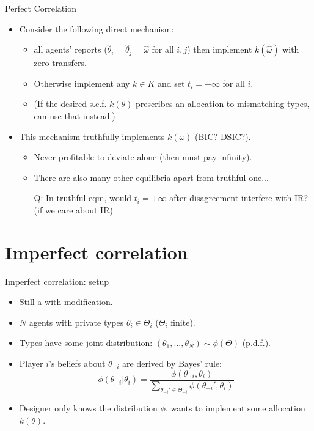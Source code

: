 \documentclass[english,10pt
,aspectratio=169
]{beamer}
\begin{document}
\begin{frame}{Perfect Correlation}
\begin{itemize}
	\item Consider the following direct mechanism:
	\begin{itemize}
		\item {} all agents' reports  ($\hat{\theta}_i=\hat{\theta}_j=\hat{\omega}$ for all $i,j$) then implement $k(\hat{\omega})$ with zero transfers.
		\item \alert{Otherwise} implement any $k \in K$ and set \alert{$t_i = +\infty$} for all $i$.
		\item (If the desired s.c.f. $k(\theta)$ prescribes an allocation to mismatching types, can use that instead.)
	\end{itemize}
	\item This mechanism truthfully implements $k(\omega)$ (BIC? DSIC?).
	\begin{itemize}
		\item Never profitable to deviate alone (then must pay infinity).
		\item There are also many other equilibria apart from truthful one...
		\item[Q:] In truthful eqm, would $t_i = +\infty$ after disagreement interfere with IR? (if we care about IR)
	\end{itemize}
\end{itemize}
\end{frame}


\section{Imperfect correlation}

\begin{frame}{Imperfect correlation: setup}
\begin{itemize}
	\item Still a  with modification.
	\item $N$ agents with private types $\theta_i \in \Theta_i$ ($\Theta_i$ finite).
	\item Types have some joint distribution: $(\theta_1,...,\theta_N) \sim \phi(\Theta)$ (p.d.f.).
	\item Player $i$'s beliefs about $\theta_{-i}$ are derived by Bayes' rule:
	$$\phi(\theta_{-i}|\theta_i) = \frac{\phi(\theta_{-i},\theta_i)}{\sum_{\theta_{-i}' \in \Theta_{-i}} \phi(\theta_{-i}',\theta_i)} $$
	\item Designer only knows the distribution $\phi$, wants to implement some allocation $k(\theta)$.
\end{itemize}
\end{frame}
\end{document}

